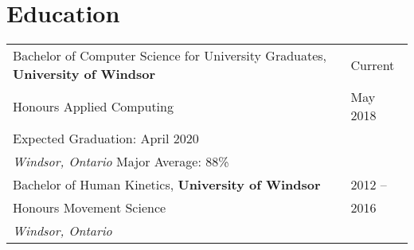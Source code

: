 \documentclass[a4paper,10.5pt]{article}
\begin{document}
\section{Education}
\begin{tabular}{p{13cm}|l}	

Bachelor of Computer Science for University Graduates, \textbf{University of Windsor} &  \small { {Current}} \\
{Honours Applied Computing} &  \small{ {May 2018}} \\
\normalsize  {Expected Graduation}: April 2020\\
\small\emph{Windsor, Ontario} \quad\quad\quad\quad\quad\quad\quad\quad\quad\quad\quad\quad\quad \quad\quad\quad\quad\quad\quad\quad\quad\quad\quad\quad Major Average: 88\%
\newline\\


Bachelor of Human Kinetics, \normalsize\textbf{University of Windsor} & \small {2012 --}  \\
{Honours Movement Science} & \small {2016} \\
\small\emph{Windsor, Ontario}\\

\end{tabular}


\end{document}
